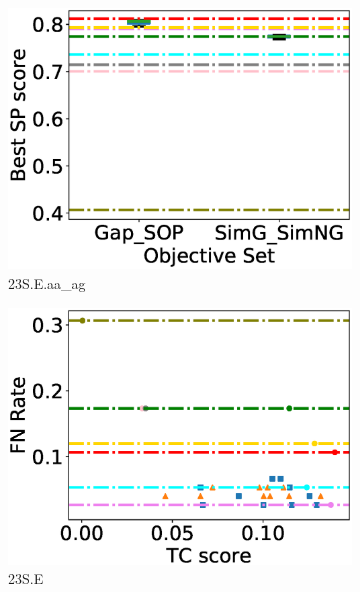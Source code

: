 \begin{figure}[!htbp]
\begin{adjustwidth}{-0.5cm}{-0.5cm}
\begin{subfigure}{0.25\textwidth}
			\includegraphics[width=\columnwidth]{Figure/summary/precomputedInit/23S.E.aa_ag/objset_pairs_rank}
			\caption{23S.E.aa\_ag}
\end{subfigure}
\begin{subfigure}{0.26\textwidth}
			\includegraphics[width=\columnwidth]{Figure/summary/precomputedInit/23S.E/fnrate_vs_tc}
			\caption{23S.E}
\end{subfigure}    
		\begin{subfigure}{0.26\textwidth}

\end{subfigure}
\end{adjustwidth}
\end{figure}
